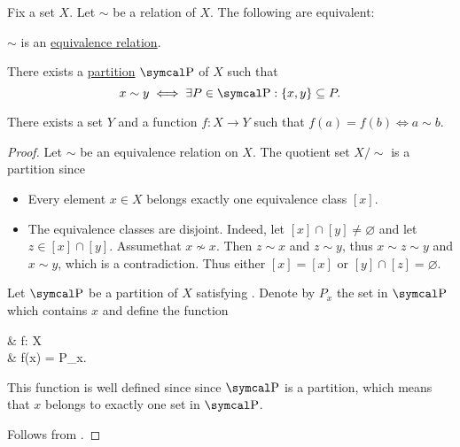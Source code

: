 \begin{proposition}\label{thm:equivalence_partition}
  Fix a set \( X \). Let \( \sim \) be a relation of \( X \). The following are equivalent:
  \begin{DefEnum}
     \( \sim \) is an \hyperref[def:equivalence_relation]{equivalence relation}.

     There exists a \hyperref[def:set_partition]{partition} \( \CP \) of \( X \) such that
    \begin{equation}\label{thm:equivalence_partition/partition/property}
      x \sim y \iff \exists P \in \CP: \{ x, y \} \subseteq P.
    \end{equation}

     There exists a set \( Y \) and a function \( f: X \to Y \) such that \( f(a) = f(b) \iff a \sim b \).
  \end{DefEnum}
\end{proposition}
\begin{proof}
   Let \( \sim \) be an equivalence relation on \( X \). The quotient set \( X / \sim \) is a partition since
  \begin{itemize}
    \item Every element \( x \in X \) belongs exactly one equivalence class \( [x] \).
    \item The equivalence classes are disjoint. Indeed, let \( [x] \cap [y] \neq \varnothing \) and let \( z \in [x] \cap [y] \). Assume\LEM that \( x \not\sim x \). Then \( z \sim x \) and \( z \sim y \), thus \( x \sim z \sim y \) and \( x \sim y \), which is a contradiction. Thus either \( [x] = [x] \) or \( [y] \cap [z] = \varnothing \).
  \end{itemize}

   Let \( \CP \) be a partition of \( X \) satisfying . Denote by \( P_x \) the set in \( \CP \) which contains \( x \) and define the function
  \begin{BreakableAlign*}
     & f: X \to \CP \\
     & f(x) = P_x.
  \end{BreakableAlign*}

  This function is well defined since since \( \CP \) is a partition, which means that \( x \) belongs to exactly one set in \( \CP \).

   Follows from .
\end{proof}
